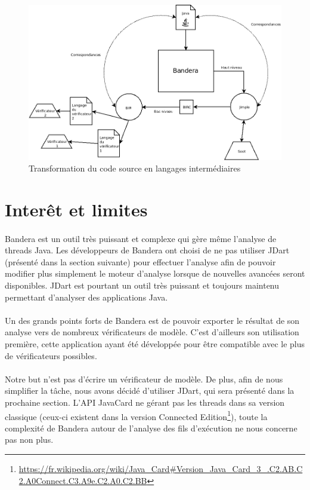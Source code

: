 \begin{figure}[H]
  \centering
  \includegraphics[scale=0.5]{images/bandera_bir_jimple.png}
  \caption{\label{fig:bir_jimple} Transformation du code source en
    langages intermédiaires}
\end{figure}

\section{Interêt et limites}

\paragraph{}
Bandera est un outil très puissant et complexe qui gère même l'analyse
de threads Java. Les développeurs de Bandera ont choisi de ne pas
utiliser JDart (présenté dans la section suivante) pour effectuer
l'analyse afin de pouvoir modifier plus simplement le moteur d'analyse
lorsque de nouvelles avancées seront disponibles. JDart est pourtant
un outil très puissant et toujours maintenu permettant d'analyser des
applications Java.

\paragraph{}
Un des grands points forts de Bandera est de pouvoir exporter le
résultat de son analyse vers de nombreux vérificateurs de
modèle. C'est d'ailleurs son utilisation première, cette application
ayant été développée pour être compatible avec le plus de
vérificateurs possibles.

\paragraph{}
Notre but n'est pas d'écrire un vérificateur de modèle. De plus, afin
de nous simplifier la tâche, nous avons décidé d'utiliser JDart, qui
sera présenté dans la prochaine section. L'API JavaCard ne gérant pas
les threads dans sa version classique (ceux-ci existent dans la
version Connected
Edition\footnote{\url{https://fr.wikipedia.org/wiki/Java_Card#Version_Java_Card_3_.C2.AB.C2.A0Connect.C3.A9e.C2.A0.C2.BB}}),
toute la complexité de Bandera autour de l'analyse des fils
d'exécution ne nous concerne pas non plus.

